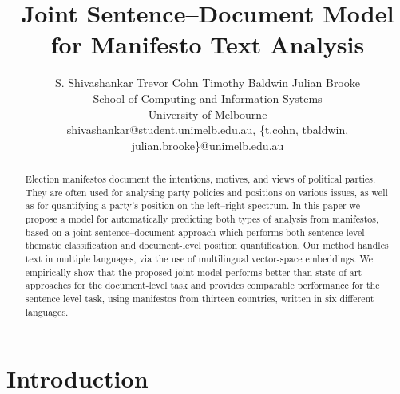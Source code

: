 \documentclass[11pt,a4paper]{article}
\title{Joint Sentence--Document Model for Manifesto Text Analysis}
\author{S. Shivashankar \qquad Trevor Cohn \qquad Timothy Baldwin \qquad Julian Brooke \\School of Computing and Information Systems\\ University of Melbourne \\ shivashankar@student.unimelb.edu.au, \{t.cohn, tbaldwin, julian.brooke\}@unimelb.edu.au}
\date{}
\begin{document}
\maketitle


\begin{abstract}
Election manifestos document the intentions, motives, and views of political parties.
They are often used for analysing party policies and positions on various issues, as well  as for quantifying a party's position on the left--right spectrum. 
In this paper we propose a model for automatically predicting both types of analysis from manifestos, based on a joint sentence--document approach which performs both sentence-level thematic classification and document-level position quantification. 
Our method handles text in multiple languages, via the use of multilingual vector-space embeddings. 
We empirically show that the proposed joint model performs better than state-of-art approaches for the document-level task and provides comparable performance for the sentence level task, using manifestos from thirteen countries, written in six different languages.
\end{abstract}

\section{Introduction}

\end{document}
